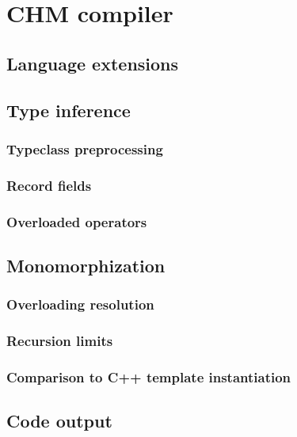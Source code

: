 \chapter{CHM compiler}

\section{Language extensions}

\section{Type inference}

\subsection{Typeclass preprocessing}

\subsection{Record fields}


\subsection{Overloaded operators}

\section{Monomorphization}

\subsection{Overloading resolution}

\subsection{Recursion limits}

\subsection{Comparison to C++ template instantiation}

\section{Code output}
